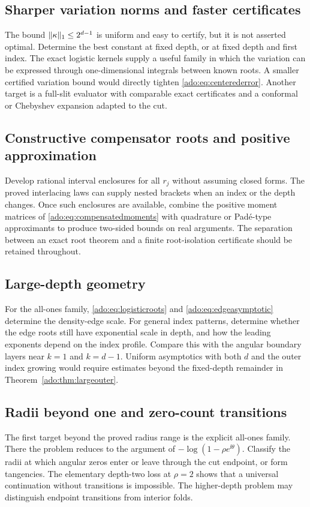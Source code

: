 \subsection{Sharper variation norms and faster certificates}
The bound $\lVert\kappa\rVert_1\le2^{d-1}$ is uniform and easy to certify,
but it is not asserted optimal. Determine the best constant at fixed
depth, or at fixed depth and first index. The exact logistic kernels
supply a useful family in which the variation can be expressed through
one-dimensional integrals between known roots. A smaller certified
variation bound would directly tighten \eqref{ado:eq:centerederror}.
Another target is a full-slit evaluator with comparable exact
certificates and a conformal or Chebyshev expansion adapted to the cut.

\subsection{Constructive compensator roots and positive approximation}
Develop rational interval enclosures for all $r_j$ without assuming
closed forms. The proved interlacing laws can supply nested brackets
when an index or the depth changes. Once such enclosures are available,
combine the positive moment matrices of
\eqref{ado:eq:compensatedmoments} with quadrature or Pad\'e-type
approximants to produce two-sided bounds on real arguments. The
separation between an exact root theorem and a finite root-isolation
certificate should be retained throughout.

\subsection{Large-depth geometry}
For the all-ones family, \eqref{ado:eq:logisticroots} and
\eqref{ado:eq:edgeasymptotic} determine the density-edge scale.
For general index patterns, determine whether the edge roots still
have exponential scale in depth, and how the leading exponents depend
on the index profile. Compare this with the angular boundary layers
near $k=1$ and $k=d-1$. Uniform asymptotics with both $d$ and the
outer index growing would require estimates beyond the fixed-depth
remainder in Theorem~\ref{ado:thm:largeouter}.

\subsection{Radii beyond one and zero-count transitions}
The first target beyond the proved radius range is the explicit all-ones
family. There the problem reduces to the argument of
$-\log(1-\rho e^{\ii\theta})$. Classify the radii at which angular
zeros enter or leave through the cut endpoint, or form tangencies.
The elementary depth-two loss at $\rho=2$ shows that a universal
continuation without transitions is impossible. The higher-depth
problem may distinguish endpoint transitions from interior folds.

